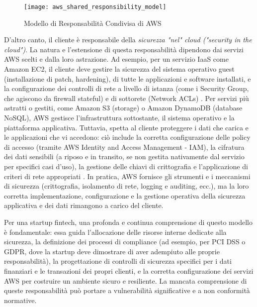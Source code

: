 \begin{figure}[h]
    \centering
    \texttt{[image: aws\_shared\_responsibility\_model]}
    \caption{Modello di Responsabilità Condivisa di AWS}
    \label{fig:shared_responsibility}
\end{figure}

D'altro canto, il cliente è responsabile della \textit{sicurezza "nel" cloud ("security in the cloud")}. La natura e l'estensione di questa responsabilità dipendono dai servizi AWS scelti e dalla loro astrazione. Ad esempio, per un servizio IaaS come Amazon EC2, il cliente deve gestire la sicurezza del sistema operativo guest (installazione di patch, hardening), di tutte le applicazioni e software installati, e la configurazione dei controlli di rete a livello di istanza (come i Security Group, che agiscono da firewall stateful) e di sottorete (Network ACLs) \cite{aws-shared-responsibility}. Per servizi più astratti o gestiti, come Amazon S3 (storage) o Amazon DynamoDB (database NoSQL), AWS gestisce l'infrastruttura sottostante, il sistema operativo e la piattaforma applicativa. Tuttavia, spetta al cliente proteggere i dati che carica e le applicazioni che vi accedono: ciò include la corretta configurazione delle policy di accesso (tramite AWS Identity and Access Management - IAM), la cifratura dei dati sensibili (a riposo e in transito, se non gestita nativamente dal servizio per specifici casi d'uso), la gestione delle chiavi di crittografia e l'applicazione di criteri di rete appropriati \cite{aws-shared-responsibility}. In pratica, AWS fornisce gli strumenti e i meccanismi di sicurezza (crittografia, isolamento di rete, logging e auditing, ecc.), ma la loro corretta implementazione, configurazione e la gestione operativa della sicurezza applicativa e dei dati rimangono a carico del cliente.

Per una startup fintech, una profonda e continua comprensione di questo modello è fondamentale: essa guida l'allocazione delle risorse interne dedicate alla sicurezza, la definizione dei processi di compliance (ad esempio, per PCI DSS o GDPR, dove la startup deve dimostrare di aver adempiuto alle proprie responsabilità), la progettazione di controlli di sicurezza specifici per i dati finanziari e le transazioni dei propri clienti, e la corretta configurazione dei servizi AWS per costruire un ambiente sicuro e resiliente. La mancata comprensione di queste responsabilità può portare a vulnerabilità significative e a non conformità normative.